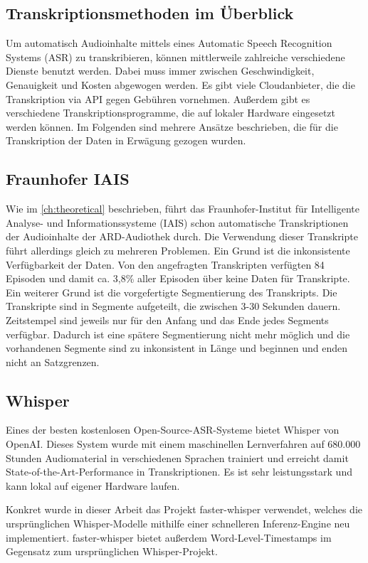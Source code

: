 \subsection{Transkriptionsmethoden im Überblick}

Um automatisch Audioinhalte mittels eines Automatic Speech Recognition Systems (ASR) zu transkribieren, können mittlerweile zahlreiche verschiedene Dienste benutzt werden.
Dabei muss immer zwischen Geschwindigkeit, Genauigkeit und Kosten abgewogen werden.
Es gibt viele Cloudanbieter, die die Transkription via API gegen Gebühren vornehmen.
Außerdem gibt es verschiedene Transkriptionsprogramme, die auf lokaler Hardware eingesetzt werden können.
Im Folgenden sind mehrere Ansätze beschrieben, die für die Transkription der Daten in Erwägung gezogen wurden.

\subsection{Fraunhofer IAIS}

Wie im \autoref{ch:theoretical} beschrieben, führt das Fraunhofer-Institut für Intelligente Analyse- und Informationssysteme (IAIS) schon automatische Transkriptionen der Audioinhalte der ARD-Audiothek durch.
Die Verwendung dieser Transkripte führt allerdings gleich zu mehreren Problemen.
Ein Grund ist die inkonsistente Verfügbarkeit der Daten.
Von den angefragten Transkripten verfügten 84 Episoden und damit ca. 3,8\% aller Episoden über keine Daten für Transkripte.
Ein weiterer Grund ist die vorgefertigte Segmentierung des Transkripts.
Die Transkripte sind in Segmente aufgeteilt, die zwischen 3-30 Sekunden dauern.
Zeitstempel sind jeweils nur für den Anfang und das Ende jedes Segments verfügbar.
Dadurch ist eine spätere Segmentierung nicht mehr möglich und die vorhandenen Segmente sind zu inkonsistent in Länge und beginnen und enden nicht an Satzgrenzen.

\subsection{Whisper}

Eines der besten kostenlosen Open-Source-ASR-Systeme bietet Whisper von OpenAI.
Dieses System wurde mit einem maschinellen Lernverfahren auf 680.000 Stunden Audiomaterial in verschiedenen Sprachen trainiert und erreicht damit State-of-the-Art-Performance in Transkriptionen.
Es ist sehr leistungsstark und kann lokal auf eigener Hardware laufen.

Konkret wurde in dieser Arbeit das Projekt faster-whisper verwendet, welches die ursprünglichen Whisper-Modelle mithilfe einer schnelleren Inferenz-Engine neu implementiert.
faster-whisper bietet außerdem Word-Level-Timestamps im Gegensatz zum ursprünglichen Whisper-Projekt.

